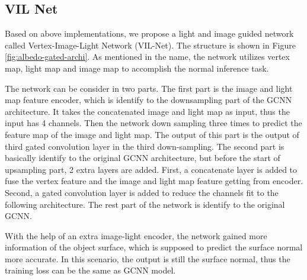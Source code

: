 \documentclass[border=15pt, multi, tikz]{article}
\begin{document}
	
	
	

\subsection{VIL Net}
Based on above implementations, we propose a light and image guided network called Vertex-Image-Light Network (VIL-Net). 
The structure is shown in Figure \ref{fig:albedo-gated-archi}. As mentioned in the name, the network utilizes vertex map, light map and image map to accomplish the normal inference task. 

The network can be consider in two parts. The first part is the image and light map feature encoder, which is identify to the downsampling part of the GCNN architecture. It takes the concatenated image and light map as input, thus the input has 4 channels. Then the network down sampling three times to predict the feature map of the image and light map. The output of this part is the output of third gated convolution layer in the third down-sampling. 
The second part is basically identify to the original GCNN architecture, but before the start of upsampling part, 2 extra layers are added. First, a concatenate layer is added to fuse the vertex feature and the image and light map feature getting from encoder. Second, a gated convolution layer is added to reduce the channels fit to the following architecture. The rest part of the network is identify to the original GCNN. 

With the help of an extra image-light encoder, the network gained more information of the object surface, which is supposed to predict the surface normal more accurate. In this scenario, the output is still the surface normal, thus the training loss can be the same as GCNN model.
\end{document}
